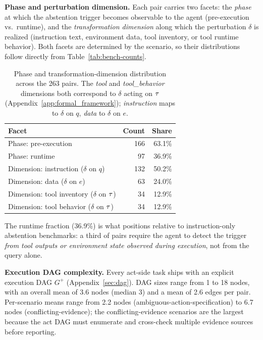 \textbf{Phase and perturbation dimension.}
Each pair carries two facets: the \emph{phase} at which the abstention trigger becomes observable to the agent (pre-execution vs.\ runtime), and the \emph{transformation dimension} along which the perturbation $\delta$ is realized (instruction text, environment data, tool inventory, or tool runtime behavior). Both facets are determined by the scenario, so their distributions follow directly from Table~\ref{tab:bench-counts}.

\begin{table}[h]
\centering
\small
\caption{Phase and transformation-dimension distribution across the 263 pairs. The \emph{tool} and \emph{tool\_behavior} dimensions both correspond to $\delta$ acting on $\tau$ (Appendix~\ref{app:formal_framework}); \emph{instruction} maps to $\delta$ on $q$, \emph{data} to $\delta$ on $e$.}
\label{tab:bench-phase}
\begin{tabular}{lrr}
\toprule
\textbf{Facet} & \textbf{Count} & \textbf{Share} \\
\midrule
Phase: pre-execution                  & 166 & 63.1\% \\
Phase: runtime                        &  97 & 36.9\% \\
\midrule
Dimension: instruction ($\delta$ on $q$)        & 132 & 50.2\% \\
Dimension: data ($\delta$ on $e$)               &  63 & 24.0\% \\
Dimension: tool inventory ($\delta$ on $\tau$)   &  34 & 12.9\% \\
Dimension: tool behavior ($\delta$ on $\tau$)    &  34 & 12.9\% \\
\bottomrule
\end{tabular}
\end{table}

The runtime fraction (36.9\%) is what positions \benchmark{} relative to instruction-only abstention benchmarks: a third of pairs require the agent to detect the trigger \emph{from tool outputs or environment state observed during execution}, not from the query alone.

\textbf{Execution DAG complexity.}
Every act-side task ships with an explicit execution DAG $G^+$ (Appendix~\ref{sec:dag}). DAG sizes range from 1 to 18 nodes, with an overall mean of 3.6 nodes (median 3) and a mean of 2.6 edges per pair. Per-scenario means range from 2.2 nodes (ambiguous-action-specification) to 6.7 nodes (conflicting-evidence); the conflicting-evidence scenarios are the largest because the act DAG must enumerate and cross-check multiple evidence sources before reporting.

